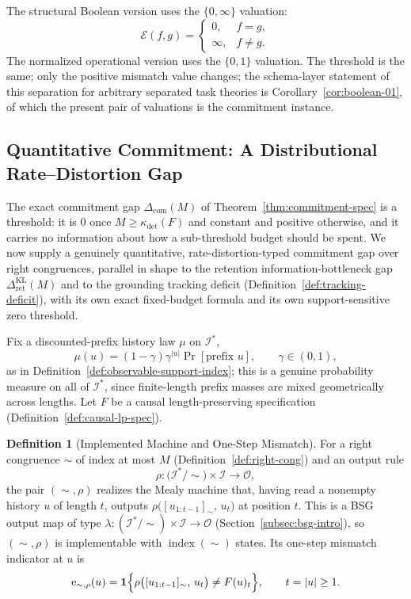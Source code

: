 \documentclass[12pt]{article}
\theoremstyle{definition}
\newtheorem{definition}[theorem]{Definition}
\newcommand{\RetKL}{\Delta_{\mathrm{ret}}^{\mathrm{KL}}}
\newcommand{\Com}{\Delta_{\mathrm{com}}}
\newcommand{\Comex}{\Com}
\begin{document}
The structural Boolean version uses the $\{0,\infty\}$ valuation:
\[
\mathcal E(f,g)=
\begin{cases}
0,&f=g,\\
\infty,&f\neq g.
\end{cases}
\]
The normalized operational version uses the $\{0,1\}$ valuation.  The threshold
is the same; only the positive mismatch value changes; the schema-layer
statement of this separation for arbitrary separated task theories is
Corollary~\ref{cor:boolean-01}, of which the present pair of valuations is
the commitment instance.

\subsection{Quantitative Commitment: A Distributional Rate--Distortion Gap}
\label{subsec:commitment-rd}

The exact commitment gap $\Comex(M)$ of Theorem~\ref{thm:commitment-spec} is
a threshold: it is $0$ once $M\ge\kappa_{\det}(F)$ and constant and positive
otherwise, and it carries no information about how a sub-threshold budget
should be spent.  We now supply a genuinely quantitative, rate-distortion-typed
commitment gap over right congruences, parallel in shape to the retention
information-bottleneck gap $\RetKL(M)$ and to the grounding tracking deficit
(Definition~\ref{def:tracking-deficit}), with its own exact fixed-budget
formula and its own support-sensitive zero threshold.

Fix a discounted-prefix history law $\mu$ on $\mathcal I^*$,
\[
\mu(u)=(1-\gamma)\gamma^{|u|}\Pr[\text{prefix }u],
\qquad \gamma\in(0,1),
\]
as in Definition~\ref{def:observable-support-index}; this is a genuine
probability measure on all of $\mathcal I^*$, since finite-length prefix
masses are mixed geometrically across lengths.  Let $F$ be a causal
length-preserving specification (Definition~\ref{def:causal-lp-spec}).

\begin{definition}[Implemented Machine and One-Step Mismatch]
\label{def:com-rd-machine}
For a right congruence $\sim$ of index at most $M$
(Definition~\ref{def:right-cong}) and an output rule
\[
\rho:\bigl(\mathcal I^*/\!\sim\bigr)\times\mathcal I\to\mathcal O,
\]
the pair $(\sim,\rho)$ realizes the Mealy machine that, having read a
nonempty history $u$ of length $t$, outputs
$\rho\bigl([u_{1:t-1}]_\sim,\,u_t\bigr)$
at position $t$.  This is a BSG output map of type
$\lambda:(\mathcal I^*/\!\sim)\times\mathcal I\to\mathcal O$
(Section~\ref{subsec:bsg-intro}), so $(\sim,\rho)$ is implementable with
$\operatorname{index}(\sim)$ states.  Its one-step mismatch indicator at $u$
is
\[
\mathrm e_{\sim,\rho}(u)
=
\mathbf 1
\Bigl\{
\rho\bigl([u_{1:t-1}]_\sim,\,u_t\bigr)
\ne
F(u)_t
\Bigr\},
\qquad t=|u|\ge1.
\]
\end{definition}
\end{document}

